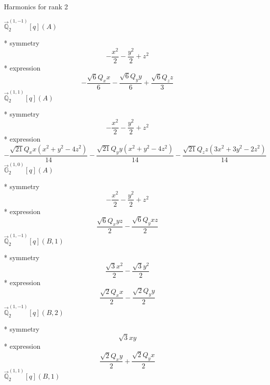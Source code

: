 \documentclass[fleqn,8pt]{jsarticle}
\begin{document}
\noindent * Harmonics for rank 2

\noindent\quad $\vec{\mathbb{Q}}_{2}^{(1,-1)}[q](A)$

\noindent\quad ** symmetry
\begin{dmath*}
- \frac{x^{2}}{2} - \frac{y^{2}}{2} + z^{2}
\end{dmath*}
\noindent\quad ** expression
\begin{dmath*}
- \frac{\sqrt{6} Q_{x} x}{6} - \frac{\sqrt{6} Q_{y} y}{6} + \frac{\sqrt{6} Q_{z} z}{3}
\end{dmath*}
\noindent\quad $\vec{\mathbb{Q}}_{2}^{(1,1)}[q](A)$

\noindent\quad ** symmetry
\begin{dmath*}
- \frac{x^{2}}{2} - \frac{y^{2}}{2} + z^{2}
\end{dmath*}
\noindent\quad ** expression
\begin{dmath*}
- \frac{\sqrt{21} Q_{x} x \left(x^{2} + y^{2} - 4 z^{2}\right)}{14} - \frac{\sqrt{21} Q_{y} y \left(x^{2} + y^{2} - 4 z^{2}\right)}{14} - \frac{\sqrt{21} Q_{z} z \left(3 x^{2} + 3 y^{2} - 2 z^{2}\right)}{14}
\end{dmath*}
\noindent\quad $\vec{\mathbb{G}}_{2}^{(1,0)}[q](A)$

\noindent\quad ** symmetry
\begin{dmath*}
- \frac{x^{2}}{2} - \frac{y^{2}}{2} + z^{2}
\end{dmath*}
\noindent\quad ** expression
\begin{dmath*}
\frac{\sqrt{6} Q_{x} y z}{2} - \frac{\sqrt{6} Q_{y} x z}{2}
\end{dmath*}
\noindent\quad $\vec{\mathbb{Q}}_{2}^{(1,-1)}[q](B,1)$

\noindent\quad ** symmetry
\begin{dmath*}
\frac{\sqrt{3} x^{2}}{2} - \frac{\sqrt{3} y^{2}}{2}
\end{dmath*}
\noindent\quad ** expression
\begin{dmath*}
\frac{\sqrt{2} Q_{x} x}{2} - \frac{\sqrt{2} Q_{y} y}{2}
\end{dmath*}
\noindent\quad $\vec{\mathbb{Q}}_{2}^{(1,-1)}[q](B,2)$

\noindent\quad ** symmetry
\begin{dmath*}
\sqrt{3} x y
\end{dmath*}
\noindent\quad ** expression
\begin{dmath*}
\frac{\sqrt{2} Q_{x} y}{2} + \frac{\sqrt{2} Q_{y} x}{2}
\end{dmath*}
\noindent\quad $\vec{\mathbb{Q}}_{2}^{(1,1)}[q](B,1)$
\end{document}
